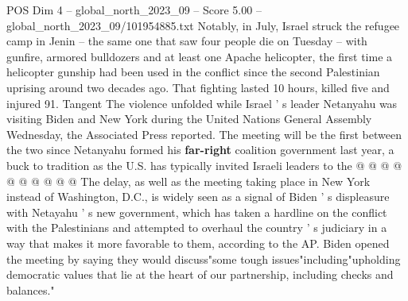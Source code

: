 \begin{textsample}{POS Dim 4 – global\_north\_2023\_09 – Score 5.00 – global\_north\_2023\_09/101954885.txt}
Notably, in July, Israel struck the refugee camp in Jenin -- the same one that saw four people die on Tuesday -- with gunfire, armored bulldozers and at least one Apache helicopter, the first time a helicopter gunship had been used in the conflict since the second Palestinian uprising around two decades ago.
That fighting lasted 10 hours, killed five and injured 91.
Tangent The violence unfolded while Israel ' s leader Netanyahu was visiting Biden and New York during the United Nations General Assembly Wednesday, the Associated Press reported.
The meeting will be the first between the two since Netanyahu formed his \textbf{far-right} coalition government last year, a buck to tradition as the U.S. has typically invited Israeli leaders to the @ @ @ @ @ @ @ @ @ @ The delay, as well as the meeting taking place in New York instead of Washington, D.C., is widely seen as a signal of Biden ' s displeasure with Netayahu ' s new government, which has taken a hardline on the conflict with the Palestinians and attempted to overhaul the country ' s judiciary in a way that makes it more favorable to them, according to the AP.
Biden opened the meeting by saying they would discuss"some tough issues"including"upholding democratic values that lie at the heart of our partnership, including checks and balances."

\end{textsample}
